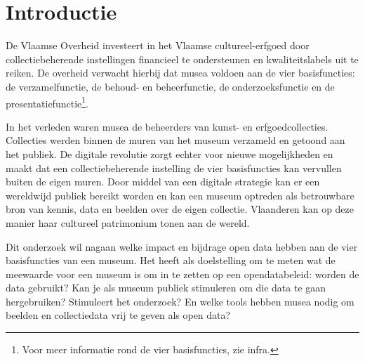 \documentclass[fleqn,10pt]{voorstel}
\affiliation{\textbf{Contact:}
  \textsuperscript{1} \href{mailto:nastasia.vanderperren.v8632@student.hogent.be}{nastasia.vanderperren.v8632@student.hogent.be}}
\begin{document}
\flushbottom %
\maketitle %
\tableofcontents %
\thispagestyle{empty} %



\section{Introductie} %
\label{sec:introductie}

De Vlaamse Overheid investeert in het Vlaamse cultureel-erfgoed door collectiebeherende instellingen financieel te ondersteunen en kwaliteitslabels uit te reiken. De overheid verwacht hierbij dat musea voldoen aan de vier basisfuncties: de verzamelfunctie, de behoud- en beheerfunctie, de onderzoeksfunctie en de presentatiefunctie\footnote{Voor meer informatie rond de vier basisfuncties, zie infra.}.

In het verleden waren musea de beheerders van kunst- en erfgoedcollecties. Collecties werden binnen de muren van het museum verzameld en getoond aan het publiek.  De digitale revolutie zorgt echter voor nieuwe mogelijkheden en maakt dat een collectiebeherende instelling de vier basisfuncties kan vervullen buiten de eigen muren. Door middel van een digitale strategie kan er een wereldwijd publiek bereikt worden en kan een museum optreden als betrouwbare bron van kennis, data en beelden over de eigen collectie. Vlaanderen kan op deze manier haar cultureel patrimonium tonen aan de wereld.  

Dit onderzoek wil nagaan welke impact en bijdrage open data hebben aan de vier basisfuncties van een museum. Het heeft als doelstelling om te meten wat de meewaarde voor een museum is om in te zetten op een opendatabeleid: worden de data gebruikt? Kan je als museum publiek stimuleren om die data te gaan hergebruiken? Stimuleert het onderzoek? En welke tools hebben musea nodig om beelden en collectiedata vrij te geven als open data?
\end{document}
